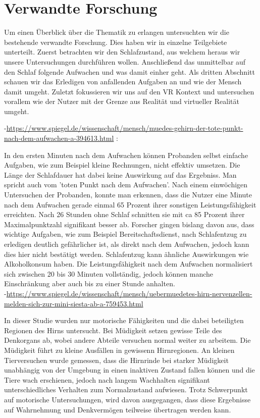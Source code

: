 \chapter{Verwandte Forschung}\label{sec:relatedWork}
Um einen Überblick über die Thematik zu erlangen untersuchten wir die bestehende verwandte Forschung. Dies haben wir in einzelne Teilgebiete unterteilt. Zuerst betrachten wir den Schlafzustand, aus welchem heraus wir unsere Untersuchungen durchführen wollen. Anschließend das unmittelbar auf den Schlaf folgende Aufwachen und was damit einher geht. Als dritten Abschnitt schauen wir das Erledigen von anfallenden Aufgaben an und wie der Mensch damit umgeht. Zuletzt fokussieren wir uns auf den VR Kontext und untersuchen vorallem wie der Nutzer mit der Grenze aus Realität und virtueller Realität umgeht.\\


 -\url{https://www.spiegel.de/wissenschaft/mensch/muedes-gehirn-der-tote-punkt-nach-dem-aufwachen-a-394613.html} :
 
 In den ersten Minuten nach dem Aufwachen können Probanden selbst einfache Aufgaben, wie zum Beispiel kleine Rechnungen, nicht effektiv umsetzen. Die Länge der Schlafdauer hat dabei keine Auswirkung auf das Ergebniss. Man spricht auch vom 'toten Punkt nach dem Aufwachen'. Nach einem einwöchigen Untersuchen der Probanden, konnte man erkennen, dass die Nutzer eine Minute nach dem Aufwachen gerade einmal 65 Prozent ihrer sonstigen Leistungsfähigkeit erreichten. Nach 26 Stunden ohne Schlaf schnitten sie mit ca 85 Prozent ihrer Maximalpunktzahl signifikant besser ab. Forscher gingen bislang davon aus, dass wichtige Aufgaben, wie zum Beispiel Bereitschaftsdienst, nach Schlafentzug zu erledigen deutlich gefährlicher ist, als direkt nach dem Aufwachen, jedoch kann dies hier nicht bestätigt werden.
 Schlafentzug kann ähnliche Auswirkungen wie Alkoholkonsum haben.
 Die Leistungsfähigkeit nach dem Aufwachen normalisiert sich zwischen 20 bis 30 Minuten vollständig, jedoch können manche Einschränkung aber auch bis zu einer Stunde anhalten. \\

-\url{https://www.spiegel.de/wissenschaft/mensch/uebermuedetes-hirn-nervenzellen-melden-sich-zur-mini-siesta-ab-a-759453.html}

In dieser Studie wurden nur motorische Fähigkeiten und die dabei beteiligten Regionen des Hirns untersucht. Bei Müdigkeit setzen gewisse Teile des Denkorgans ab, wobei andere Abteile versuchen normal weiter zu arbeitem. Die Müdigkeit führt zu kleine Ausfällen in gewissenn Hirnregionen. An kleinen Tierversuchen wurde gemessen, dass die Hirnrinde bei starker Müdigkeit unabhängig von der Umgebung in einen inaktiven Zustand fallen können und die Tiere wach erschienen, jedoch nach langem Wachhalten signifikant unterschiedliches Verhalten zum Normalzustand aufwiesen. Trotz Schwerpunkt auf motorische Untersuchungen, wird davon ausgegangen, dass diese Ergebnisse auf Wahrnehmung und Denkvermögen teilweise übertragen werden kann.\\


